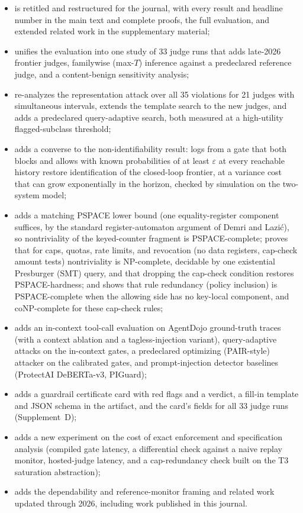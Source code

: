 \documentclass[11pt]{article}
\begin{document}
\begin{itemize}\setlength{\itemsep}{0.2em}\setlength{\parskip}{0pt}
\item is retitled and restructured for the journal, with every result and headline number
in the main text and complete proofs, the full evaluation, and extended related work in the
supplementary material;
\item unifies the evaluation into one study of 33 judge runs that adds late-2026
frontier judges, familywise (max-$T$) inference against a predeclared reference
judge, and a content-benign sensitivity analysis;
\item re-analyzes the representation attack over all 35 violations for 21 judges with
simultaneous intervals, extends the template search to the new judges, and adds a
predeclared query-adaptive search, both measured at a high-utility flagged-subclass
threshold;
\item adds a converse to the non-identifiability result: logs from a gate that both blocks
and allows with known probabilities of at least $\varepsilon$ at every reachable history
restore identification of the closed-loop frontier, at a variance cost that can grow
exponentially in the horizon, checked by simulation on the two-system model;
\item adds a matching PSPACE lower bound (one equality-register component suffices, by the
standard register-automaton argument of Demri and Lazi\'c), so nontriviality of the keyed-counter fragment is
PSPACE-complete; proves that for caps, quotas, rate limits, and revocation (no data registers,
cap-check amount tests) nontriviality is NP-complete, decidable by one existential Presburger (SMT) query, and that
dropping the cap-check condition restores PSPACE-hardness; and shows that rule redundancy (policy inclusion) is
PSPACE-complete when the allowing side has no key-local component, and coNP-complete for these cap-check rules;
\item adds an in-context tool-call evaluation on AgentDojo ground-truth traces (with a context
ablation and a tagless-injection variant), query-adaptive attacks on the in-context gates, a
predeclared optimizing (PAIR-style) attacker on the calibrated gates, and prompt-injection detector
baselines (ProtectAI DeBERTa-v3, PIGuard);
\item adds a guardrail certificate card with red flags and a verdict, a fill-in template and JSON
schema in the artifact, and the card's fields for all 33 judge runs (Supplement~D);
\item adds a new experiment on the cost of exact enforcement and specification
analysis (compiled gate latency, a differential check against a naive replay monitor,
hosted-judge latency, and a cap-redundancy check built on the T3 saturation
abstraction);
\item adds the dependability and reference-monitor framing and related work updated through 2026, including work published in this journal.
\end{itemize}
\end{document}
